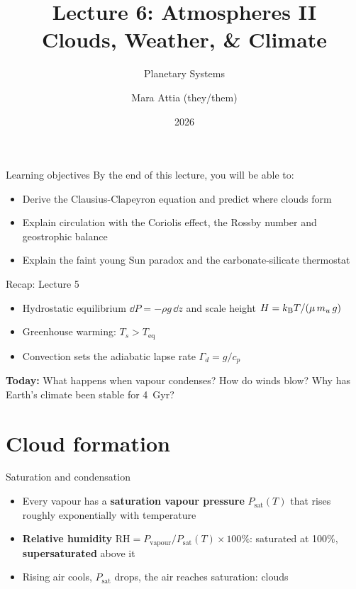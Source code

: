 \documentclass[aspectratio=169, 11pt]{beamer}
\title[Lecture 6: Atmospheres II]{Lecture 6: Atmospheres II\\Clouds, Weather, \& Climate}
\subtitle{Planetary Systems}
\author[L6]{Mara Attia (they/them)}
\institute{Kapteyn Astronomical Institute\\University of Groningen}
\date{2026}
\begin{document}
\begin{frame}
  \titlepage
\end{frame}

\begin{frame}{Learning objectives}
  By the end of this lecture, you will be able to:
  \vskip8pt
  \begin{itemize}
    \item Derive the Clausius-Clapeyron equation and predict where clouds form
    \item Explain circulation with the Coriolis effect, the Rossby number and geostrophic balance
    \item Explain the faint young Sun paradox and the carbonate-silicate thermostat
  \end{itemize}
\end{frame}

\begin{frame}{Recap: Lecture 5}
  \begin{itemize}
    \item Hydrostatic equilibrium $\dd P = -\rho g\,\dd z$ and scale height $H = k_{\mathrm{B}} T / (\mu\,m_u\,g)$
    \item Greenhouse warming: $T_s > T_{\mathrm{eq}}$
    \item Convection sets the adiabatic lapse rate $\Gamma_d = g / c_p$
  \end{itemize}
  \vskip8pt
  \textbf{Today:} What happens when vapour condenses? How do winds blow? Why has Earth's climate been stable for 4~Gyr?
\end{frame}


\section{Cloud formation}

\begin{frame}{Saturation and condensation}
  \begin{itemize}\setlength\itemsep{4pt}
    \item Every vapour has a \textbf{saturation vapour pressure} $P_{\mathrm{sat}}(T)$ that rises roughly exponentially with temperature
    \item \textbf{Relative humidity} $\mathrm{RH} = P_{\mathrm{vapour}}/P_{\mathrm{sat}}(T) \times 100\%$: saturated at 100\%, \textbf{supersaturated} above it
    \item Rising air cools, $P_{\mathrm{sat}}$ drops, the air reaches saturation: clouds
  \end{itemize}
\end{frame}
\end{document}
